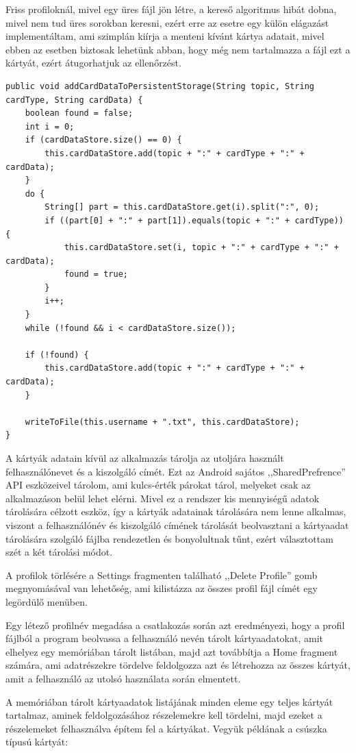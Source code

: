 \documentclass[
]{thesis-ekf}
\theoremstyle{definition}
\theoremstyle{remark}
\begin{document}
Friss profiloknál, mivel egy üres fájl jön létre, a kereső algoritmus hibát dobna, mivel nem tud üres sorokban
keresni, ezért erre az esetre egy külön elágazást implementáltam, ami szimplán kiírja a menteni kívánt kártya adatait,
mivel ebben az esetben biztosak lehetünk abban, hogy még nem tartalmazza a fájl ezt a kártyát, ezért átugorhatjuk az
ellenőrzést.


\lstset{language=Java}  
\begin{lstlisting}[frame=single]
public void addCardDataToPersistentStorage(String topic, String cardType, String cardData) {
	boolean found = false;
	int i = 0;
	if (cardDataStore.size() == 0) {
		this.cardDataStore.add(topic + ":" + cardType + ":" + cardData);
	}
	do {
		String[] part = this.cardDataStore.get(i).split(":", 0);
		if ((part[0] + ":" + part[1]).equals(topic + ":" + cardType)) {
			this.cardDataStore.set(i, topic + ":" + cardType + ":" + cardData);
			found = true;
		}
		i++;
	}
	while (!found && i < cardDataStore.size());

	if (!found) {
		this.cardDataStore.add(topic + ":" + cardType + ":" + cardData);
	}

	writeToFile(this.username + ".txt", this.cardDataStore);
}
\end{lstlisting}

A kártyák adatain kívül az alkalmazás tárolja az utoljára használt felhasználónevet és a kiszolgáló címét.
Ezt az Android sajátos ,,SharedPrefrence'' API eszközeivel tárolom, ami kulcs-érték párokat tárol, melyeket csak az
alkalmazáson belül lehet elérni.
Mivel ez a rendszer kis mennyiségű adatok tárolására célzott eszköz, így a kártyák adatainak tárolására nem lenne
alkalmas, viszont a felhasználónév és kiszolgáló címének tárolását beolvasztani a kártyaadat tárolására szolgáló
fájlba rendezetlen és bonyolultnak tűnt, ezért választottam szét a két tárolási módot.

A profilok törlésére a Settings fragmenten található ,,Delete Profile'' gomb megnyomásával van lehetőség,
ami kilistázza az összes profil fájl címét egy legördülő menüben.

Egy létező profilnév megadása a csatlakozás során azt eredményezi, hogy a profil fájlból a program beolvassa a felhasználó nevén
tárolt kártyaadatokat, amit elhelyez egy memóriában tárolt listában, majd azt továbbítja a Home fragment számára, ami
adatrészekre tördelve feldolgozza azt és létrehozza az összes kártyát, amit a felhasználó az utolsó használata során
elmentett.

A memóriában tárolt kártyaadatok listájának minden eleme egy teljes kártyát tartalmaz, aminek feldolgozásához részelemekre
kell tördelni, majd ezeket a részelemeket felhasználva építem fel a kártyákat. Vegyük példának a csúszka típusú kártyát:
\end{document}
